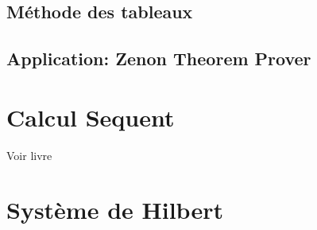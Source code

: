 \documentclass{paper}
\begin{document}
\subsection{Méthode des tableaux}
\subsection{Application: Zenon Theorem Prover}

\section{Calcul Sequent}
Voir livre

\section{Système de Hilbert}
\end{document}
